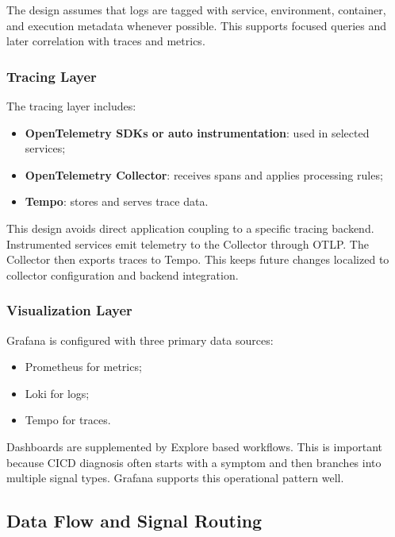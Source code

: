 The design assumes that logs are tagged with service, environment, container, and execution metadata whenever possible. This supports focused queries and later correlation with traces and metrics.

\subsubsection{Tracing Layer}
\label{subsubsec:tracing_layer}

The tracing layer includes:
\begin{itemize}
    \item \textbf{OpenTelemetry SDKs or auto instrumentation}: used in selected services;
    \item \textbf{OpenTelemetry Collector}: receives spans and applies processing rules;
    \item \textbf{Tempo}: stores and serves trace data.
\end{itemize}

This design avoids direct application coupling to a specific tracing backend. Instrumented services emit telemetry to the Collector through \gls{OTLP}. The Collector then exports traces to Tempo. This keeps future changes localized to collector configuration and backend integration.

\subsubsection{Visualization Layer}
\label{subsubsec:visualization_layer}

Grafana is configured with three primary data sources:
\begin{itemize}
    \item Prometheus for metrics;
    \item Loki for logs;
    \item Tempo for traces.
\end{itemize}

Dashboards are supplemented by Explore based workflows. This is important because \gls{CICD} diagnosis often starts with a symptom and then branches into multiple signal types. Grafana supports this operational pattern well.

\subsection{Data Flow and Signal Routing}
\label{subsec:data_flow}

